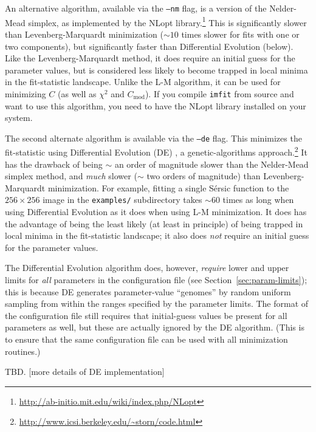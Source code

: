 \documentclass[10pt,a4paper,article]{memoir}
\newcommand{\imfit}{\texttt{imfit}}
\newcommand{\chisquare}{\ensuremath{\chi^{2}}}
\begin{document}
An alternative algorithm, available via the \texttt{--nm} flag,  is a
version of the Nelder-Mead simplex, as implemented by the NLopt
library.\footnote{\url{http://ab-initio.mit.edu/wiki/index.php/NLopt}}
This is significantly slower than Levenberg-Marquardt minimization
($\sim 10$ times slower for fits with one or two components), but
significantly faster than Differential Evolution (below). Like the
Levenberg-Marquardt method, it does require an initial guess for the
parameter values, but is considered less likely to become trapped in
local minima in the fit-statistic landscape. Unlike the L-M algorithm,
it can be used for minimizing $C$ (as well as \chisquare{} and
$C_{\mathrm{mod}}$). If you compile \imfit{} from source and want to use
this algorithm, you need to have the NLopt library installed on your
system.

The second alternate algorithm is available via the \texttt{--de} flag.
This minimizes the fit-statistic using Differential Evolution (DE)
\citep{de}, a genetic-algorithms
approach.\footnote{\url{http://www.icsi.berkeley.edu/~storn/code.html}}
It has the drawback of being $\sim$ an order of magnitude slower than
the Nelder-Mead simplex method, and \textit{much} slower ($\sim$ two
orders of magnitude) than Levenberg-Marquardt minimization. For example,
fitting a single S\'ersic function to the $256 \times 256$ image in the
\texttt{examples/} subdirectory takes $\sim 60$ times as long when using
Differential Evolution as it does when using L-M minimization. It does
has the advantage of being the least likely (at least in principle) of
being trapped in local minima in the fit-statistic landscape; it also
does \textit{not} require an initial guess for the parameter values.

The Differential Evolution algorithm does, however, \textit{require}
lower and upper limits for \textit{all} parameters in the configuration
file (see Section~\ref{sec:param-limits}); this is because DE generates
parameter-value ``genomes'' by random uniform sampling from within the
ranges specified by the parameter limits. The format of the
configuration file still requires that initial-guess values be present
for all parameters as well, but these are actually ignored by the DE
algorithm. (This is to ensure that the same configuration file can be
used with all minimization routines.)


\medskip

TBD. [more details of DE implementation]

\medskip
\end{document}
